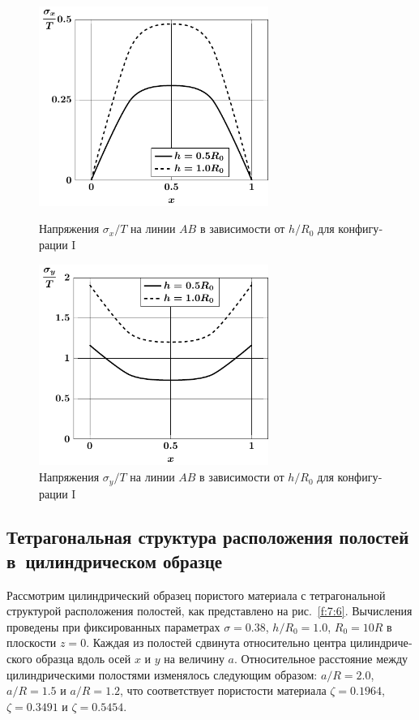 \begin{russian}
\begin{figure}
\centering\footnotesize
\parbox[b]{7.5cm}{\centering\includegraphics[width=7.5cm]{image-2-x.pdf}
\caption{Напряжения $\sigma_x/T$ на линии $AB$ в зависимости от $h/R_0$ для конфигурации I
\label{f:7:11}}}\hfil\hfil
\parbox[b]{7.5cm}{\centering\includegraphics[width=7.5cm]{image-2-y.pdf}
\caption{Напряжения $\sigma_y/T$ на линии $AB$ в зависимости от $h/R_0$ для конфигурации I
\label{f:7:12}}}
\end{figure}


\subsection{Тетрагональная структура расположения полостей в~цилиндрическом образце}

Рассмотрим цилиндрический образец пористого материала с тетрагональной структурой расположения полостей, как представлено на рис.~\ref{f:7:6}. Вычисления проведены при фиксированных параметрах $\sigma=0.38$, $h/R_0=1.0$, $R_0=10R$ в плоскости $z=0$. Каждая из полостей сдвинута относительно центра цилиндрического образца вдоль осей $x$ и $y$ на величину $a$. Относительное расстояние между цилиндрическими полостями изменялось следующим образом: $a/R=2.0$, $a/R=1.5$ и $a/R=1.2$, что соответствует пористости материала $\zeta=0.1964$, $\zeta=0.3491$ и $\zeta=0.5454$.


\end{russian}
